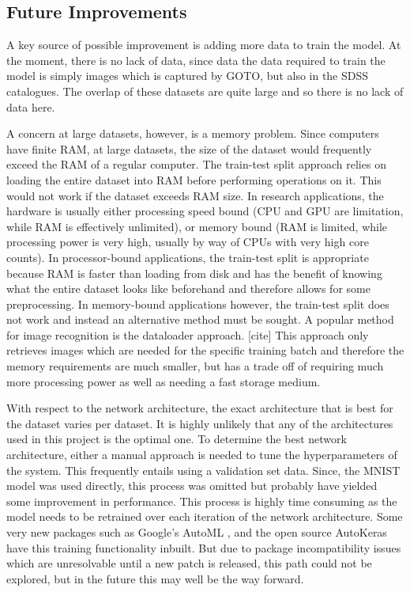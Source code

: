 \documentclass[a4paper,fleqn,usenatbib]{mnras}
\begin{document}
\subsection{Future Improvements}
A key source of possible improvement is adding more data to train the model. At the moment, there is no lack of data, since data the data required to train the model is simply images which is captured by GOTO, but also in the SDSS catalogues. The overlap of these datasets are quite large and so there is no lack of data here. 

A concern at large datasets, however, is a memory problem. Since computers have finite RAM, at large datasets, the size of the dataset would frequently exceed the RAM of a regular computer. The train-test split approach relies on loading the entire dataset into RAM before performing operations on it. This would not work if the dataset exceeds RAM size. In research applications, the hardware is usually either processing speed bound (CPU and GPU are limitation, while RAM is effectively unlimited), or memory bound (RAM is limited, while processing power is very high, usually by way of CPUs with very high core counts). In processor-bound applications, the train-test split is appropriate because RAM is faster than loading from disk and has the benefit of knowing what the entire dataset looks like beforehand and therefore allows for some preprocessing. In memory-bound applications however, the train-test split does not work and instead an alternative method must be sought. A popular method for image recognition is the dataloader approach. [cite] This approach only retrieves images which are needed for the specific training batch and therefore the memory requirements are much smaller, but has a trade off of requiring much more processing power as well as needing a fast storage medium. 

With respect to the network architecture, the exact architecture that is best for the dataset varies per dataset. It is highly unlikely that any of the architectures used in this project is the optimal one. To determine the best network architecture, either a manual approach is needed to tune the hyperparameters of the system. This frequently entails using a validation set data. Since, the MNIST model was used directly, this process was omitted but probably have yielded some improvement in performance. This process is highly time consuming as the model needs to be retrained over each iteration of the network architecture. Some very new packages such as Google's AutoML \cite{AutoML}, and the open source AutoKeras \cite{AutoKeras} have this training functionality inbuilt. But due to package incompatibility issues which are unresolvable until a new patch is released, this path could not be explored, but in the future this may well be the way forward. 
\end{document}
